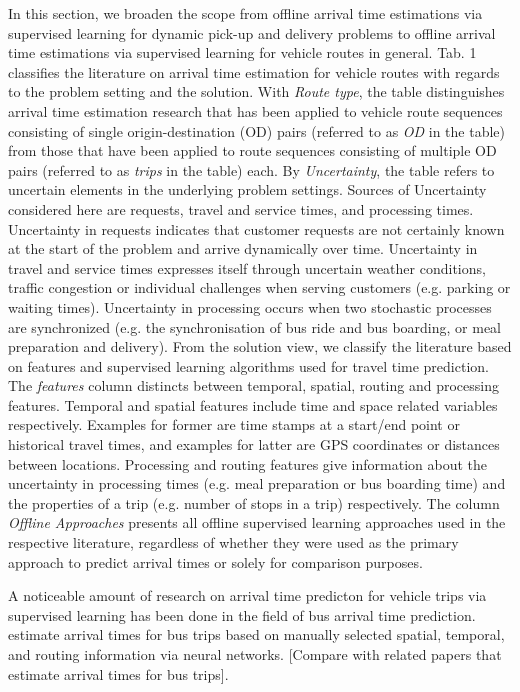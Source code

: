 In this section, we broaden the scope from offline arrival time estimations via supervised learning for dynamic pick-up and delivery problems to offline arrival time estimations via supervised learning for vehicle routes in general.
Tab. 1 classifies the literature on arrival time estimation for vehicle routes with regards to the problem setting and the solution.
With \textit{Route type}, the table distinguishes arrival time estimation research that has been applied to vehicle route sequences consisting of single origin-destination (OD) pairs (referred to as \textit{OD} in the table) from those that have been applied to route sequences consisting of multiple OD pairs (referred to as \textit{trips} in the table) each.
By \textit{Uncertainty}, the table refers to uncertain elements in the underlying problem settings. Sources of Uncertainty considered here are requests, travel and service times, and processing times. Uncertainty in requests indicates that customer requests are not certainly known at the start of the problem and arrive dynamically over time. Uncertainty in travel and service times expresses itself through uncertain weather conditions, traffic congestion or individual challenges when serving customers (e.g. parking or waiting times). Uncertainty in processing occurs when two stochastic processes are synchronized (e.g. the synchronisation of bus ride and bus boarding, or meal preparation and delivery). From the solution view, we classify the literature based on features and supervised learning algorithms used for travel time prediction. The \textit{features} column distincts between temporal, spatial, routing and processing features.
Temporal and spatial features include time and space related variables respectively. Examples for former are time stamps at a start/end point or historical travel times, and examples for latter are GPS coordinates or distances between locations. Processing and routing features give information about the uncertainty in processing times (e.g. meal preparation or bus boarding time) and the properties of a trip (e.g. number of stops in a trip) respectively.
The column \textit{Offline Approaches} presents all offline supervised learning approaches used in the respective literature, regardless of whether they were used as the primary approach to predict arrival times or solely for comparison purposes. 

A noticeable amount of research on arrival time predicton for vehicle trips via supervised learning has been done in the field of bus arrival time prediction. \cite{Chen2004_ANNKalman} estimate arrival times for bus trips based on manually selected spatial, temporal, and routing information via neural networks. [Compare with related papers that estimate arrival times for bus trips].

